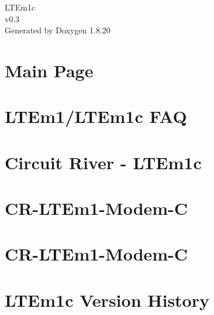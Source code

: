 \let\mypdfximage\pdfximage\def\pdfximage{\immediate\mypdfximage}\documentclass[twoside]{book}
\newcommand{\+}{\discretionary{\mbox{\scriptsize$\hookleftarrow$}}{}{}}
\newcommand{\clearemptydoublepage}{%
  \newpage{\pagestyle{empty}\cleardoublepage}%
}
\begin{document}
\hypersetup{pageanchor=false,
             bookmarksnumbered=true,
             pdfencoding=unicode
            }
\begin{titlepage}
\vspace*{7cm}
\begin{center}%
{\Large L\+T\+Em1c \\[1ex]\large v0.\+3 }\\
\vspace*{1cm}
{\large Generated by Doxygen 1.8.20}\\
\end{center}
\end{titlepage}
\clearemptydoublepage
{}
\tableofcontents
\clearemptydoublepage
{}
\hypersetup{pageanchor=true}

\chapter{Main Page}
\label{index}\hypertarget{index}{}
\chapter{L\+T\+Em1/\+L\+T\+Em1c F\+AQ}
\label{md__l_t_em1-_f_a_q}

\chapter{Circuit River -\/ L\+T\+Em1c}
\label{md__r_e_a_d_m_e}

\chapter{C\+R-\/\+L\+T\+Em1-\/\+Modem-\/C}
\label{md_tests__l_t_em1c-1-platform__r_e_a_d_m_e}

\chapter{C\+R-\/\+L\+T\+Em1-\/\+Modem-\/C}
\label{md_tests__l_t_em1c-2-components__r_e_a_d_m_e}

\chapter{L\+T\+Em1c Version History}
\label{md_version-history}

\end{document}
